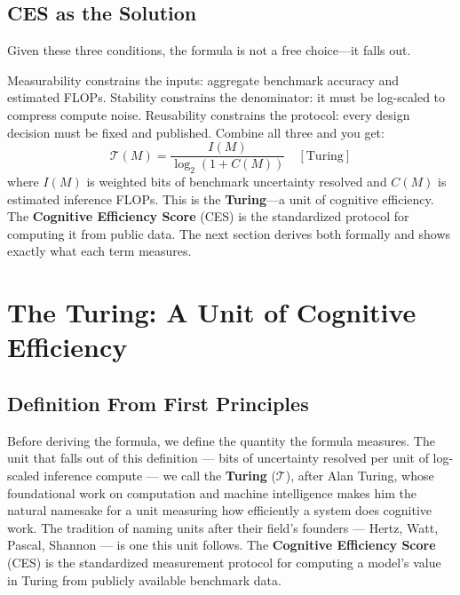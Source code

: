 \documentclass[12pt]{article}
\begin{document}
\subsection{CES as the Solution}

Given these three conditions, the formula is not a free choice---it falls out.

Measurability constrains the inputs: aggregate benchmark accuracy and estimated FLOPs.
Stability constrains the denominator: it must be log-scaled to compress compute noise.
Reusability constrains the protocol: every design decision must be fixed and published.
Combine all three and you get:
\begin{equation}
\mathcal{T}(M) = \frac{I(M)}{\log_2(1 + C(M))} \quad [\text{Turing}]
\end{equation}
where $I(M)$ is weighted bits of benchmark uncertainty resolved and $C(M)$ is estimated
inference FLOPs. This is the \textbf{Turing}---a unit of cognitive efficiency. The
\textbf{Cognitive Efficiency Score} (CES) is the standardized protocol for computing it
from public data. The next section derives both formally and shows exactly what each term
measures.

\section{The Turing: A Unit of Cognitive Efficiency}
\label{sec:turing}

\subsection{Definition From First Principles}

Before deriving the formula, we define the quantity the formula measures. The unit that falls out of this definition --- bits of uncertainty resolved per unit of log-scaled inference compute --- we call the \textbf{Turing} ($\mathcal{T}$), after Alan Turing, whose foundational work on computation and machine intelligence makes him the natural namesake for a unit measuring how efficiently a system does cognitive work. The tradition of naming units after their field's founders --- Hertz, Watt, Pascal, Shannon --- is one this unit follows. The \textbf{Cognitive Efficiency Score} (CES) is the standardized measurement protocol for computing a model's value in Turing from publicly available benchmark data.
\end{document}

